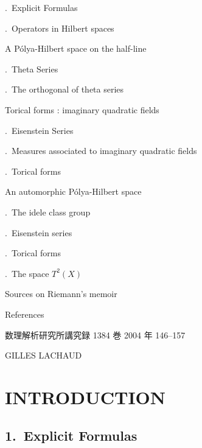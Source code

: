 \documentclass[12pt]{article}
\begin{document}
.\ Explicit Formulas 

.\ Operators in Hilbert spaces 

\noindent
A Pólya-Hilbert space on the half-line 

.\ Theta Series 

.\ The orthogonal of theta series 

\noindent
Torical forms : imaginary quadratic fields 

.\ Eisenstein Series 

.\ Measures associated to imaginary quadratic fields 

.\ Torical forms 

\noindent
An automorphic Pólya-Hilbert space 

.\ The idele class group 

.\ Eisenstein series 

.\ Torical forms 

.\ The space $T^2(X)$ 

\noindent
Sources on Riemann's memoir 

\noindent
References 

\newpage

\noindent
数理解析研究所講究録 1384 巻 2004 年 146--157

\vspace{2em}

\begin{center}
GILLES LACHAUD
\end{center}

\vspace{1em}

\section*{INTRODUCTION}

\subsection*{1.\ Explicit Formulas}
\end{document}
